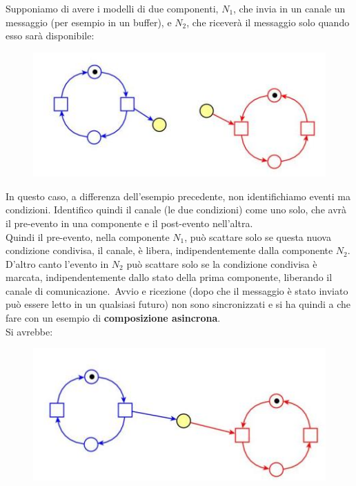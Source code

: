 \begin{esempio}
  Supponiamo di avere i modelli di due componenti, $N_1$, che invia in un canale
  un messaggio (per esempio in un buffer), e $N_2$, che riceverà il messaggio
  solo quando esso sarà disponibile:
  \begin{figure}[H]
    \centering
    \includegraphics[scale = 0.5]{img/asinc.jpg} 
  \end{figure}
  In questo caso, a differenza dell'esempio precedente, non identifichiamo
  eventi ma condizioni. Identifico quindi il canale (le due condizioni) come uno
  solo, che avrà il pre-evento in una componente e il post-evento nell'altra.\\
  Quindi il pre-evento, nella componente $N_1$, può scattare solo se questa
  nuova condizione condivisa, il canale, è libera, indipendentemente dalla
  componente $N_2$. D'altro canto l'evento in $N_2$ può scattare solo se la
  condizione condivisa è marcata, indipendentemente dallo stato della prima
  componente, liberando il canale di comunicazione.\
  Avvio e ricezione (dopo che il messaggio è stato inviato può essere letto in
  un qualsiasi futuro) non sono sincronizzati e si ha quindi a che fare con
  un esempio di \textbf{composizione asincrona}.\\
  Si avrebbe:
  \begin{figure}[H]
    \centering
    \includegraphics[scale = 0.5]{img/asinc2.jpg} 
  \end{figure}
\end{esempio}
